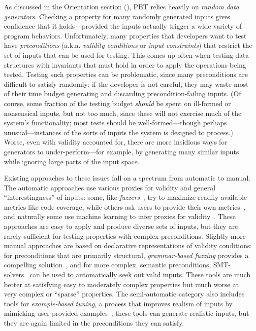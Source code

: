 As discussed in the Orientation section
(), PBT relies heavily on {\em random data
generators}.  Checking a property for many randomly generated inputs
gives confidence that it holds---provided the inputs actually trigger a wide
variety of program behaviors.
Unfortunately,
many properties that developers want to test have {\em preconditions}
(a.k.a.\relax{} {\em validity conditions} or {\em input constraints}) that
restrict the set of inputs that can be used for testing. This comes up often
when testing data structures with invariants that must hold in order to apply
the operations being tested. Testing such properties can be problematic, since
many preconditions are difficult to satisfy randomly; if the developer is not
careful, they may waste most of their time budget generating and
discarding precondition-failing inputs.
%
(Of course, some fraction of the testing budget {\em should} be spent on
ill-formed or nonsensical inputs, but not too much, since these will not
exercise much of the system's functionality; most tests should be
well-formed---though perhaps unusual---instances of the sorts of inputs the
system is designed to process.)
%
Worse, even with validity accounted for, there are
more insidious ways for generators to under-perform---for example, by
generating many similar inputs while ignoring large parts of
the input space.

Existing approaches to these issues
fall on a spectrum from automatic to manual. The automatic approaches use
various proxies for validity and general ``interestingness'' of
inputs: some, like {\em
fuzzers}~\cite{afl-readme}, try to maximize readily available metrics like code
coverage, while others ask users to provide their own metrics~\cite{loscher2017targetedpbt}, and
naturally some use machine learning to infer proxies for
validity~\cite{godefroid2017learn, DBLP:conf/icse/ReddyLPS20}. These approaches
are easy to apply and produce diverse sets of inputs, but they are rarely
sufficient for testing properties with complex preconditions. Slightly more
manual approaches are based on declarative representations of validity
conditions: for preconditions that are primarily structural, {\em grammar-based
fuzzing} provides a compelling solution~\cite{godefroid2008grammar,
holler2012fuzzing, veggalam2016ifuzzer, wang2019superion,
srivastava2021gramatron}, and for more complex, semantic preconditions,
SMT-solvers~\cite{dewey2017automated, beginners-luck,
steinhofel_input_2022} can be used to automatically seek out valid
inputs. These tools are
much better at satisfying easy to moderately complex properties but
much worse at very complex or ``sparse'' properties. The semi-automatic
category also includes tools for {\em example-based tuning}, a process that
improves realism of inputs by mimicking user-provided
examples~\cite{soremekun2020inputs}; these tools can generate
realistic inputs, but they are again limited in the preconditions they can
satisfy.

